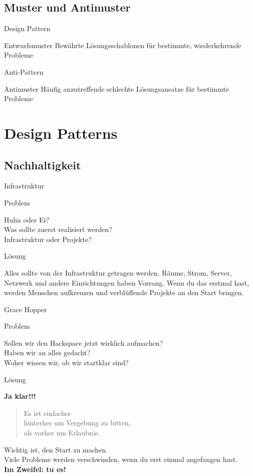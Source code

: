 \documentclass[aspectratio=43]{beamer}
\newcommand{\concept}[2]{
  \begin{block}{#1}
    \pause
    #2
  \end{block}
}
\newcommand{\pattern}[2]{
  \begin{alertblock}{Problem}
    #1
  \end{alertblock}
  \pause
  \begin{exampleblock}{Lösung}
    #2
  \end{exampleblock}
}
\begin{document}
  \subsection{Muster und Antimuster}

  \begin{frame}{Design Pattern}
    \concept{Entwurfsmuster}{Bewährte Lösungsschablonen für bestimmte, wiederkehrende Probleme}
  \end{frame}

  \begin{frame}{Anti-Pattern}
    \concept{Antimuster}{Häufig anzutreffende schlechte Lösungsansatze für bestimmte Probleme}
  \end{frame}

  \section{Design Patterns}

  \subsection{Nachhaltigkeit}

  \begin{frame}{Infrastruktur}
    \pattern{
      Huhn oder Ei?\\
      Was sollte zuerst realisiert werden?\\
      Infrastruktur oder Projekte?
    }{
      Alles sollte von der Infrastruktur getragen werden. Räume, Strom, Server,
      Netzwerk und andere Einrichtungen haben Vorrang. Wenn du das erstmal hast,
      werden Menschen aufkreuzen und verblüffende Projekte an den Start
      bringen.
    }
  \end{frame}

  \begin{frame}{Grace Hopper}
    \pattern{
      Sollen wir den Hackspace jetzt wirklich aufmachen?\\
      Haben wir an alles gedacht?\\
      Woher wissen wir, ob wir startklar sind?
    }{
      \textbf{Ja klar!!!}
      \pause
      \begin{quote}
        Es ist einfacher\\
        hinterher um Vergebung zu bitten,\\
        als vorher um Erlaubnis.
      \end{quote}
      \pause
      Wichtig ist, den Start zu machen.\\
      Viele Probleme werden verschwinden, wenn du erst einmal angefangen hast.\\
      \textbf{Im Zweifel: tu es!}
    }
  \end{frame}
\end{document}
